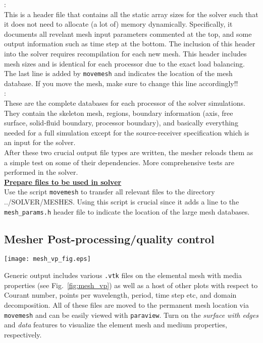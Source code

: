 \documentclass[11pt,letter,fleqn,english,notitlepage]{article}
\begin{document}
: \\
This is a header file that contains all the static array 
sizes for the solver such that it does not need to allocate (a lot of) 
memory dynamically. Specifically, it documents all revelant mesh input 
parameters commented at the top, and some output information such as 
time step at the bottom.  The inclusion of this header into the solver 
requires recompilation for each new mesh. This header includes 
mesh sizes and is identical for each processor due to the exact load balancing.
The last line is added by {\tt movemesh} and indicates the location of the mesh 
database. If you move the mesh, make sure to change this line accordingly!!
\\

: \\
These are the complete databases for each processor of the 
solver simulations. They contain the skeleton mesh, regions, boundary 
information (axis, free surface, solid-fluid boundary, processor boundary), 
and basically everything needed for a full simulation except for the 
source-receiver specification which is an input for the solver. \\

\noindent After these two crucial output file types are written, the mesher reloads them as a
simple test on some of their dependencies. More comprehensive tests are 
performed in the solver. \\

\noindent\textbf{\underline{Prepare files to be used in solver}}\\
Use the script {\tt movemesh} to transfer all relevant files to the directory ../SOLVER/MESHES. 
Using this script is crucial since it adds 
a line to the {\tt mesh\_params.h} header file to indicate the location of the large mesh 
databases.

\subsection{Mesher Post-processing/quality control }
\begin{figure*}[htb]
\begin{center}\label{fig:mesh_vp}
\texttt{[image: mesh\_vp\_fig.eps]}
\caption{\textit{The elemental mesh (blue lines) for IASP91 at 20 seconds superimposed on the $v_p$ velocity. 
The plot is derived straight from the file {\tt mesh\_vp.vtk} produced by the mesher. Zoom sections of the 
central region and crust/upper mantle are added to highlight the topological features.}}
\end{center}
\end{figure*}
%
\noindent Generic output includes various {\tt *.vtk} files on the elemental mesh with media properties 
(see Fig.~\ref{fig:mesh_vp}) as well as a host of other plots with respect to Courant number, 
points per wavelength, period, time step etc, and domain decomposition.
All of these files are moved to the permanent mesh location via {\tt movemesh} and can be easily viewed with {\tt paraview}. 
Turn on the \textit{surface with edges} and \textit{data} features to visualize the element mesh and medium 
properties, respectively.
\end{document}
